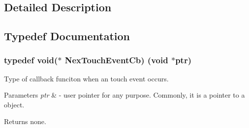\subsection{Detailed Description}


\subsection{Typedef Documentation}
\hypertarget{group___touch_event_ga95f5c2ce3d34b0b7e7d2cac3076a768e}{}
\subsubsection[{Nex\+Touch\+Event\+Cb}]{\setlength{\rightskip}{0pt plus 5cm}typedef void($\ast$ Nex\+Touch\+Event\+Cb) (void $\ast$ptr)}\label{group___touch_event_ga95f5c2ce3d34b0b7e7d2cac3076a768e}


Type of callback funciton when an touch event occurs. 


\begin{DoxyParams}{Parameters}
{\em ptr} & -\/ user pointer for any purpose. Commonly, it is a pointer to a object. \\
\hline
\end{DoxyParams}
\begin{DoxyReturn}{Returns}
none. 
\end{DoxyReturn}
